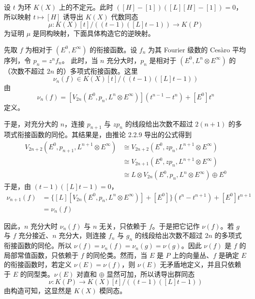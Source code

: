 
设 $t$ 为环 $K(X)$ 上的不定元。此时 $([H]-[1])([L][H]-[1])=0$，所以映射 $t\mapsto[H]$ 诱导出 $K(X)$ 代数同态
\[
\mu\colon K(X)[t]/((t-1)([L]t-1))\longrightarrow K(P)
\]
为证明 $\mu$ 是同构映射，下面具体构造它的逆映射。

先取 $f$ 为相对于 $(E^0,E^\infty)$ 的衔接函数。设 $f_n$ 为其 Fourier 级数的 Cesàro 平均序列，令 $p_n=z^nf_n$。
此时，当 $n$ 充分大时，$p_n$ 是相对于 $(E^0,L^n\otimes E^\infty)$ 的（次数不超过 $2n$ 的）多项式衔接函数。这里
\[
\nu_n(f)\in K(X)[t]/((t-1)([L]t-1))
\]
由
\[
\nu_n(f)=[V_{2n}(E^0,p_n,L^n\otimes E^\infty)](t^{n-1}-t^n)+[E^0]t^n
\]
定义。


于是，对充分大的 $n$，连接 $p_{n+1}$ 与 $zp_n$ 的线段给出次数不超过 $2(n+1)$ 的多项式衔接函数的同伦。其结果是，由推论 2.2.9 导出的公式得到
\[
\begin{aligned}
V_{2n+2}(E^0,p_{n+1},L^{n+1}\otimes E^\infty)
&\cong V_{2n+2}(E^0,zp_n,L^{n+1}\otimes E^\infty)\\
&\cong V_{2n+1}(E^0,zp_n,L^{n+1}\otimes E^\infty)\\
&\cong L\otimes V_{2n}(E^0,p_n,L^n\otimes E^\infty)\oplus E^0
\end{aligned}
\]
于是，由 $(t-1)([L]t-1)=0$，
\[
\begin{aligned}
\nu_{n+1}(f)&=\{[L][V_{2n}(E^0,p_n,L^n\otimes E^\infty)]+[E^0]\}(t^n-t^{n+1})+[E^0]t^{n+1}\\
&=\nu_n(f)
\end{aligned}
\]

因此，$n$ 充分大时 $\nu_n(f)$ 与 $n$ 无关，只依赖于 $f$。于是把它记作 $\nu(f)$。若 $g$ 与 $f$ 充分接近、$n$ 充分大，则连接 $f_n$ 与 $g_n$ 的线段给出次数不超过 $2n$ 的多项式衔接函数的同伦。所以 $\nu(f)=\nu_n(f)=\nu_n(g)=\nu(g)$。因此 $\nu(f)$ 是 $f$ 的局部常值函数，只依赖于 $f$ 的同伦类。然而，当 $E$ 是 $P$ 上的向量丛、$f$ 是确定 $E$ 的衔接函数时，若定义 $\nu(E)=\nu(f)$，则 $\nu(E)$ 无矛盾地定义，并且只依赖于 $E$ 的同型类。$\nu(E)$ 对直和 $\oplus$ 显然可加，所以诱导出群同态
\[
\nu\colon K(P)\longrightarrow K(X)[t]/((t-1)([L]t-1))
\]
由构造可知，这显然是 $K(X)$ 模同态。

